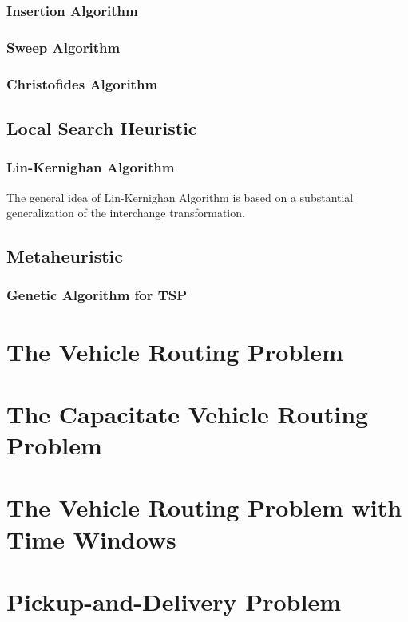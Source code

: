 				\subsection{Insertion Algorithm}

				\subsection{Sweep Algorithm}

				\subsection{Christofides Algorithm}

			\section{Local Search Heuristic}
				\subsection{Lin-Kernighan Algorithm}
					The general idea of Lin-Kernighan Algorithm is based on a substantial generalization of the interchange transformation.

			\section{Metaheuristic}
				\subsection{Genetic Algorithm for TSP}


		\chapter{The Vehicle Routing Problem}

		\chapter{The Capacitate Vehicle Routing Problem}

		\chapter{The Vehicle Routing Problem with Time Windows}

		\chapter{Pickup-and-Delivery Problem}\label{chp:PDP}
